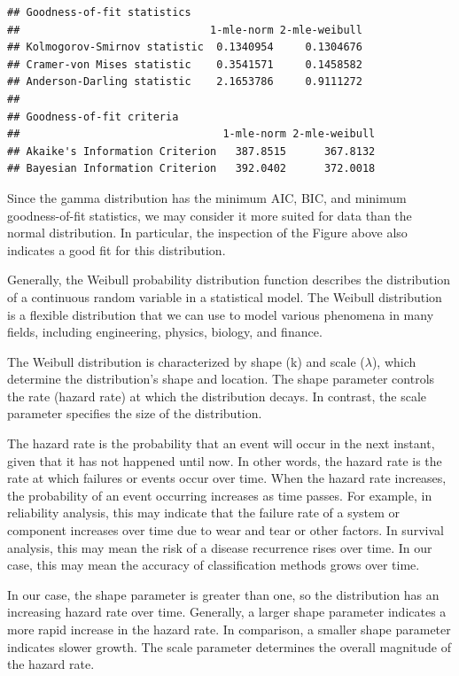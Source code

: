 \documentclass[
]{article}
\begin{document}
\begin{verbatim}
## Goodness-of-fit statistics
##                              1-mle-norm 2-mle-weibull
## Kolmogorov-Smirnov statistic  0.1340954     0.1304676
## Cramer-von Mises statistic    0.3541571     0.1458582
## Anderson-Darling statistic    2.1653786     0.9111272
## 
## Goodness-of-fit criteria
##                                1-mle-norm 2-mle-weibull
## Akaike's Information Criterion   387.8515      367.8132
## Bayesian Information Criterion   392.0402      372.0018
\end{verbatim}

Since the gamma distribution has the minimum AIC, BIC, and minimum goodness-of-fit statistics, we may consider it more suited for data than the normal distribution. In particular, the inspection of the Figure above also indicates a good fit for this distribution.

Generally, the Weibull probability distribution function describes the distribution of a continuous random variable in a statistical model. The Weibull distribution is a flexible distribution that we can use to model various phenomena in many fields, including engineering, physics, biology, and finance.

The Weibull distribution is characterized by shape (k) and scale (\(\lambda\)), which determine the distribution's shape and location. The shape parameter controls the rate (hazard rate) at which the distribution decays. In contrast, the scale parameter specifies the size of the distribution.

The hazard rate is the probability that an event will occur in the next instant, given that it has not happened until now. In other words, the hazard rate is the rate at which failures or events occur over time. When the hazard rate increases, the probability of an event occurring increases as time passes. For example, in reliability analysis, this may indicate that the failure rate of a system or component increases over time due to wear and tear or other factors. In survival analysis, this may mean the risk of a disease recurrence rises over time. In our case, this may mean the accuracy of classification methods grows over time.

In our case, the shape parameter is greater than one, so the distribution has an increasing hazard rate over time. Generally, a larger shape parameter indicates a more rapid increase in the hazard rate. In comparison, a smaller shape parameter indicates slower growth. The scale parameter determines the overall magnitude of the hazard rate.
\end{document}
